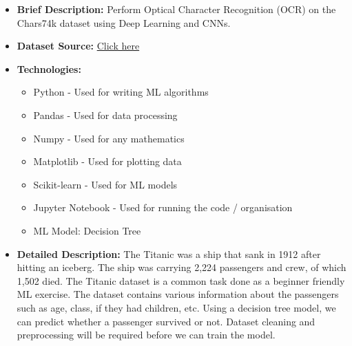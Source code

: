 \documentclass{article}
\begin{document}
\begin{itemize}
    \item \textbf{Brief Description:} Perform Optical Character Recognition (OCR) on the Chars74k dataset using Deep Learning and CNNs.
    \item \textbf{Dataset Source:} \href{https://web.stanford.edu/class/archive/cs/cs109/cs109.1166/problem12.html}{Click here}
    \item \textbf{Technologies:}
    \begin{itemize}
        \item Python - Used for writing ML algorithms
        \item Pandas - Used for data processing
        \item Numpy - Used for any mathematics
        \item Matplotlib - Used for plotting data
        \item Scikit-learn - Used for ML models
        \item Jupyter Notebook - Used for running the code / organisation
        \item ML Model: Decision Tree
    \end{itemize}
    \item \textbf{Detailed Description:} The Titanic was a ship that sank in 1912 after hitting an iceberg. The ship was carrying 2,224 passengers and crew, of which 1,502 died. 
    The Titanic dataset is a common task done as a beginner friendly ML exercise. The dataset contains various information about the passengers such as age, class, if they had children, etc.
    Using a decision tree model, we can predict whether a passenger survived or not. Dataset cleaning and preprocessing will be required before we can train the model.
\end{itemize}
\end{document}
